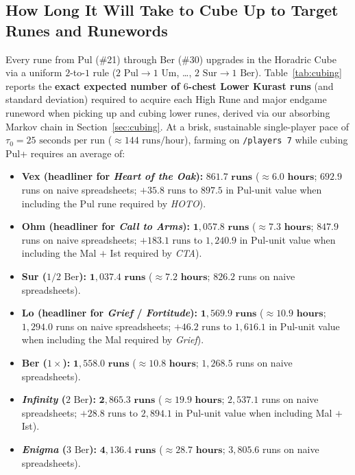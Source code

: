 \documentclass[11pt,reqno]{amsart}
\theoremstyle{definition}
\begin{document}
\subsection{How Long It Will Take to Cube Up to Target Runes and Runewords}
\label{subsec:bluf_runs}

Every rune from Pul (\#21) through Ber (\#30) upgrades in the Horadric Cube via a uniform $2$-to-$1$ rule ($2\text{ Pul} \to 1\text{ Um}$, \dots, $2\text{ Sur} \to 1\text{ Ber}$). Table~\ref{tab:cubing} reports the \textbf{exact expected number of $6$-chest Lower Kurast runs} (and standard deviation) required to acquire each High Rune and major endgame runeword when picking up and cubing lower runes, derived via our absorbing Markov chain in Section~\ref{sec:cubing}. At a brisk, sustainable single-player pace of $\tau_0 = 25\text{ seconds per run}$ ($\approx 144\text{ runs/hour}$), farming on \texttt{/players~7} while cubing Pul+ requires an average of:
\begin{itemize}
    \item \textbf{Vex (headliner for \emph{Heart of the Oak}):} $\mathbf{861.7\text{ runs}}$ ($\approx \mathbf{6.0\text{ hours}}$; $692.9$ runs on naive spreadsheets; $+35.8\text{ runs}$ to $897.5$ in Pul-unit value when including the Pul rune required by \emph{HOTO}).
    \item \textbf{Ohm (headliner for \emph{Call to Arms}):} $\mathbf{1{,}057.8\text{ runs}}$ ($\approx \mathbf{7.3\text{ hours}}$; $847.9$ runs on naive spreadsheets; $+183.1\text{ runs}$ to $1{,}240.9$ in Pul-unit value when including the Mal $+$ Ist required by \emph{CTA}).
    \item \textbf{Sur ($1/2\text{ Ber}$):} $\mathbf{1{,}037.4\text{ runs}}$ ($\approx \mathbf{7.2\text{ hours}}$; $826.2$ runs on naive spreadsheets).
    \item \textbf{Lo (headliner for \emph{Grief} / \emph{Fortitude}):} $\mathbf{1{,}569.9\text{ runs}}$ ($\approx \mathbf{10.9\text{ hours}}$; $1{,}294.0$ runs on naive spreadsheets; $+46.2\text{ runs}$ to $1{,}616.1$ in Pul-unit value when including the Mal required by \emph{Grief}).
    \item \textbf{Ber ($1\times$):} $\mathbf{1{,}558.0\text{ runs}}$ ($\approx \mathbf{10.8\text{ hours}}$; $1{,}268.5$ runs on naive spreadsheets).
    \item \textbf{\emph{Infinity} ($2\text{ Ber}$):} $\mathbf{2{,}865.3\text{ runs}}$ ($\approx \mathbf{19.9\text{ hours}}$; $2{,}537.1$ runs on naive spreadsheets; $+28.8\text{ runs}$ to $2{,}894.1$ in Pul-unit value when including Mal $+$ Ist).
    \item \textbf{\emph{Enigma} ($3\text{ Ber}$):} $\mathbf{4{,}136.4\text{ runs}}$ ($\approx \mathbf{28.7\text{ hours}}$; $3{,}805.6$ runs on naive spreadsheets).
\end{itemize}
\end{document}
